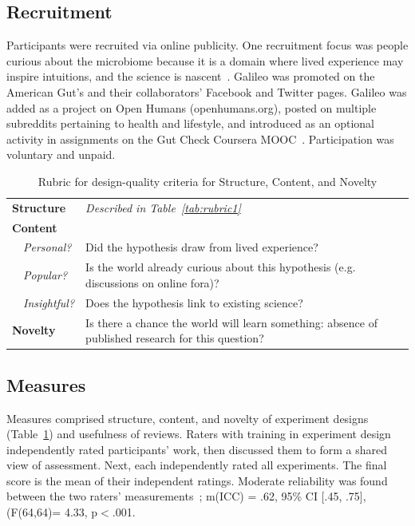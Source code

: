 \subsection*{Recruitment}
Participants were recruited via online publicity. One recruitment focus was people curious about the microbiome because it is a domain where lived experience may inspire intuitions, and the science is nascent~\cite{McDonald2018a}. Galileo was promoted on the American Gut's and their collaborators' Facebook and Twitter pages. Galileo was added as a project on Open Humans (openhumans.org), posted on multiple subreddits pertaining to health and lifestyle, and introduced as an optional activity in assignments on the Gut Check Coursera MOOC~\cite{Knight2016}. Participation was voluntary and unpaid. 


\vspace{0.25in}
\begin{table}[!ht]
\caption[Rubric for design-quality criteria for Structure, Content, and Novelty]
{Rubric for design-quality criteria for Structure, Content, and Novelty}


\vspace{-0.25in}
\begin{center}
\renewcommand{\arraystretch}{1.5}
\begin{tabular}{p{1.5in}p{4in}}
\hline
\textbf{Structure} &  \textit{Described in Table~\ref{tab:rubric1}} \\
\textbf{Content}  & \\
~~\textit{Personal?} & Did the hypothesis draw from lived experience? \\
~~\textit{Popular?} & Is the world already curious about this hypothesis (e.g. discussions on online fora)?  \\
~~\textit{Insightful?} & Does the hypothesis link to existing science?  \\
\textbf{Novelty}  &  Is there a chance the world will learn something: absence of published research for this question?\\
\hline
\end{tabular}
\end{center}
\label{tab:rubric2}
\end{table}

\subsection*{Measures}
Measures comprised structure, content, and novelty of experiment designs (Table~\ref{tab:rubric2}) and usefulness of reviews. Raters with training in experiment design independently rated participants' work, then discussed them to form a shared view of assessment. Next, each independently rated all experiments. The final score is the mean of their independent ratings. Moderate reliability was found between the two raters' measurements~\cite{koo2016guideline}; m(ICC) = .62, 95\% CI [.45, .75], (F(64,64)= 4.33, p$<$.001. 

